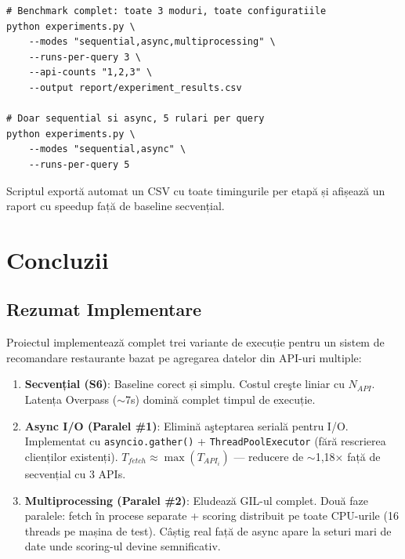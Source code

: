 \documentclass[12pt,a4paper]{article}
\begin{document}
\begin{lstlisting}[style=bash]
# Benchmark complet: toate 3 moduri, toate configuratiile
python experiments.py \
    --modes "sequential,async,multiprocessing" \
    --runs-per-query 3 \
    --api-counts "1,2,3" \
    --output report/experiment_results.csv

# Doar sequential si async, 5 rulari per query
python experiments.py \
    --modes "sequential,async" \
    --runs-per-query 5
\end{lstlisting}

Scriptul exportă automat un CSV cu toate timingurile per etapă și afișează un raport cu speedup față de baseline secvențial.

\section{Concluzii}

\subsection{Rezumat Implementare}

Proiectul implementează complet trei variante de execuție pentru un sistem de recomandare restaurante bazat pe agregarea datelor din API-uri multiple:

\begin{enumerate}
  \item \textbf{Secvențial (S6)}: Baseline corect și simplu. Costul creşte liniar cu $N_{API}$.
        Latența Overpass ($\sim$7s) domină complet timpul de execuție.

  \item \textbf{Async I/O (Paralel \#1)}: Elimină aşteptarea serială pentru I/O.
        Implementat cu \texttt{asyncio.gather()} + \texttt{ThreadPoolExecutor} (fără rescrierea clienților existenți).
        $T_{fetch} \approx \max(T_{API_i})$ --- reducere de $\sim$1{,}18× față de secvențial cu 3 APIs.

  \item \textbf{Multiprocessing (Paralel \#2)}: Eludează GIL-ul complet. Două faze paralele:
        fetch în procese separate + scoring distribuit pe toate CPU-urile (16 threads pe mașina de test).
        Câștig real față de async apare la seturi mari de date unde scoring-ul devine semnificativ.
\end{enumerate}
\end{document}
